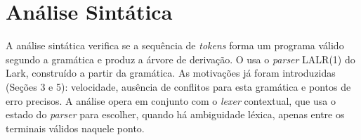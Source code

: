 \documentclass[12pt]{article}
\renewcommand\texttt[1]{\svtt{\small#1}}
\begin{document}

\section{Análise Sintática}

A análise sintática verifica se a sequência de \emph{tokens} forma um
programa válido segundo a gramática e produz a árvore de
derivação. O \texttt{jass} usa o \emph{parser} LALR(1) do Lark, construído
a partir da gramática. As motivações já foram introduzidas (Seções 3 e 5):
velocidade, ausência de conflitos para esta gramática e pontos de erro
precisos. A análise opera em conjunto com o \textit{lexer} contextual,
que usa o estado do \emph{parser} para escolher, quando há ambiguidade
léxica, apenas entre os terminais válidos naquele ponto.



\end{document}
